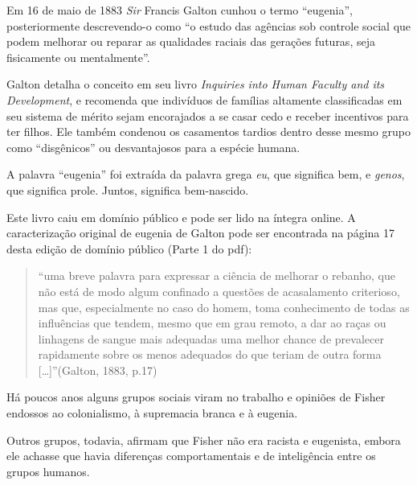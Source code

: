 \documentclass[
]{book}
\begin{document}
\hfill\break

Em 16 de maio de 1883 \emph{Sir} Francis Galton cunhou o termo ``eugenia'', posteriormente descrevendo-o como ``o estudo das agências sob controle social que podem melhorar ou reparar as qualidades raciais das gerações futuras, seja fisicamente ou mentalmente''.

\hfill\break

Galton detalha o conceito em seu livro \emph{Inquiries into Human Faculty and its Development}, e recomenda que indivíduos de famílias altamente classificadas em seu sistema de mérito sejam encorajados a se casar cedo e receber incentivos para ter filhos. Ele também condenou os casamentos tardios dentro desse mesmo grupo como ``disgênicos'' ou desvantajosos para a espécie humana.

\hfill\break

A palavra ``eugenia'' foi extraída da palavra grega \emph{eu}, que significa bem, e \emph{genos}, que significa prole. Juntos, significa bem-nascido.

\hfill\break

Este livro caiu em domínio público e pode ser lido na íntegra online. A caracterização original de eugenia de Galton pode ser encontrada na página 17 desta edição de domínio público (Parte 1 do pdf):

\hfill\break

\begin{quote}
``uma breve palavra para expressar a ciência de melhorar o rebanho, que não está de modo algum confinado a questões de acasalamento criterioso, mas que, especialmente no caso do homem, toma conhecimento de todas as influências que tendem, mesmo que em grau remoto, a dar ao raças ou linhagens de sangue mais adequadas uma melhor chance de prevalecer rapidamente sobre os menos adequados do que teriam de outra forma {[}\ldots{]}''(Galton, 1883, p.17)
\end{quote}

\hfill\break

Há poucos anos alguns grupos sociais viram no trabalho e opiniões de Fisher endossos ao colonialismo, à supremacia branca e à eugenia.

\hfill\break

Outros grupos, todavia, afirmam que Fisher não era racista e eugenista, embora ele achasse que havia diferenças comportamentais e de inteligência entre os grupos humanos.

\hfill\break
\end{document}
